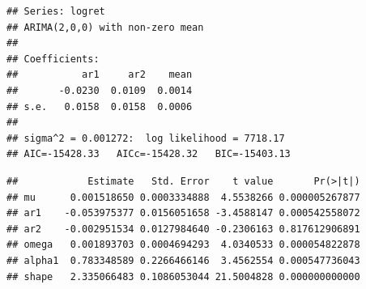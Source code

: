 \documentclass[
]{book}
\newenvironment{Shaded}{\begin{snugshade}}{\end{snugshade}}
\newcommand{\AttributeTok}[1]{\textcolor[rgb]{0.13,0.29,0.53}{#1}}
\newcommand{\CommentTok}[1]{\textcolor[rgb]{0.56,0.35,0.01}{\textit{#1}}}
\newcommand{\DecValTok}[1]{\textcolor[rgb]{0.00,0.00,0.81}{#1}}
\newcommand{\FunctionTok}[1]{\textcolor[rgb]{0.13,0.29,0.53}{\textbf{#1}}}
\newcommand{\NormalTok}[1]{#1}
\newcommand{\OtherTok}[1]{\textcolor[rgb]{0.56,0.35,0.01}{#1}}
\newcommand{\SpecialCharTok}[1]{\textcolor[rgb]{0.81,0.36,0.00}{\textbf{#1}}}
\newcommand{\StringTok}[1]{\textcolor[rgb]{0.31,0.60,0.02}{#1}}
\begin{document}
\begin{verbatim}
## Series: logret 
## ARIMA(2,0,0) with non-zero mean 
## 
## Coefficients:
##           ar1     ar2    mean
##       -0.0230  0.0109  0.0014
## s.e.   0.0158  0.0158  0.0006
## 
## sigma^2 = 0.001272:  log likelihood = 7718.17
## AIC=-15428.33   AICc=-15428.32   BIC=-15403.13
\end{verbatim}

\begin{Shaded}
\end{Shaded}

\begin{verbatim}
##            Estimate   Std. Error    t value       Pr(>|t|)
## mu      0.001518650 0.0003334888  4.5538266 0.000005267877
## ar1    -0.053975377 0.0156051658 -3.4588147 0.000542558072
## ar2    -0.002951534 0.0127984640 -0.2306163 0.817612906891
## omega   0.001893703 0.0004694293  4.0340533 0.000054822878
## alpha1  0.783348589 0.2266466146  3.4562554 0.000547736043
## shape   2.335066483 0.1086053044 21.5004828 0.000000000000
\end{verbatim}
\end{document}
